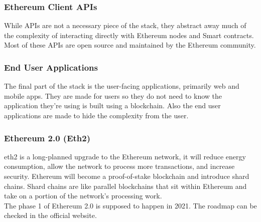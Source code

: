         \subsubsection{Ethereum Client APIs}
            While APIs are not a necessary piece of the stack, they abstract away much of the complexity of interacting directly with Ethereum nodes and Smart contracts.\\
            
            Most of these APIs are open source and maintained by the Ethereum community.

        \subsubsection{End User Applications}
            The final part of the stack is the user-facing applications, primarily web and mobile apps.  They are made for users so they do not need to know the application they're using is built using a blockchain. Also the end user applications are made to hide the complexity from the user.
            
        \subsubsection{Ethereum 2.0 (Eth2)}
            \acrshort{eth2}\cite{eth2} is a long-planned upgrade to the Ethereum network, it will reduce energy consumption, allow the network to process more transactions, and increase security.  Ethereum will become a proof-of-stake blockchain and introduce shard chains. Shard chains are like parallel blockchains that sit within Ethereum and take on a portion of the network's processing work.\\
            
            The phase 1 of Ethereum 2.0 is supposed to happen in 2021. The roadmap can be checked in the official website\cite{eth2Roadmap}.

